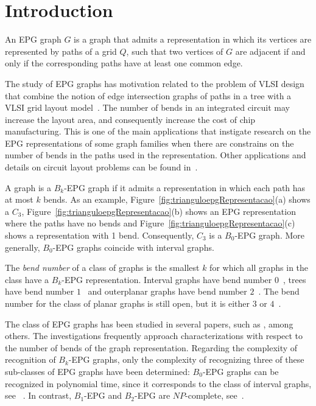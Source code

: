 \documentclass[runningheads]{llncs}
\begin{document}
\section{Introduction}
An EPG graph $G$ is a graph that admits a representation in which its vertices are represented by paths of a grid $Q$, such that two vertices of $G$ are adjacent if and only if the corresponding paths have at least one common edge. 

The study of EPG graphs has motivation related to the problem of VLSI design that combine the notion  of  edge  intersection graphs  of  paths  in  a  tree  with  a  VLSI  grid  layout  model~\cite{golumbic2009}. The number of bends in an integrated circuit may increase the layout area, and consequently increase the cost of chip manufacturing.
This is one of the main applications that instigate research on the EPG representations of some graph families when there are constrains on the number of bends in the paths used in the representation.
Other applications and  details  on  circuit  layout  problems can be found in~\cite{bandy1990, molitor1991}.  %

A graph is a $ B_k$-EPG graph if it admits a representation in which each path has at most $k$ bends. As an example, Figure~\ref{fig:trianguloepgRepresentacao}(a) shows a $C_3$, Figure~\ref{fig:trianguloepgRepresentacao}(b) shows an EPG representation where the paths have no bends and Figure~\ref{fig:trianguloepgRepresentacao}(c) shows a representation with 1 bend.   
 Consequently, $C_3$ is a $B_0$-EPG graph. More generally, $B_0$-EPG graphs coincide with interval graphs.

The \emph{bend number} of a class of graphs is the smallest $k$ for which all graphs in the class have a $B_k$-EPG representation. Interval graphs have bend number $0$~\cite{golumbic2009}, trees have bend number $1$~\cite{golumbic2009} and outerplanar graphs have bend number $2$~\cite{daniel2014b}. The bend number for the class of planar graphs is still open, but it is either $ 3 $ or $4$~\cite{daniel2014b}.



The class of EPG graphs has been studied in several papers, such as \cite{alcon2016, Asinowski2009, cohen2014, golumbic2009, heldt2014,  martin2017}, among others. The investigations frequently approach characterizations with respect to the number of bends of the graph representation. Regarding the complexity of recognition of $B_k$-EPG graphs, only the complexity of recognizing three of these sub-classes of EPG graphs have been determined: %
 $B_0$-EPG graphs can be recognized in polynomial time, since it corresponds to the class of interval graphs, see ~\cite{booth1976}. In contrast, $B_1$-EPG and $B_2$-EPG are $NP$-complete, see~\cite{heldt2014, martin2017}.
\end{document}
